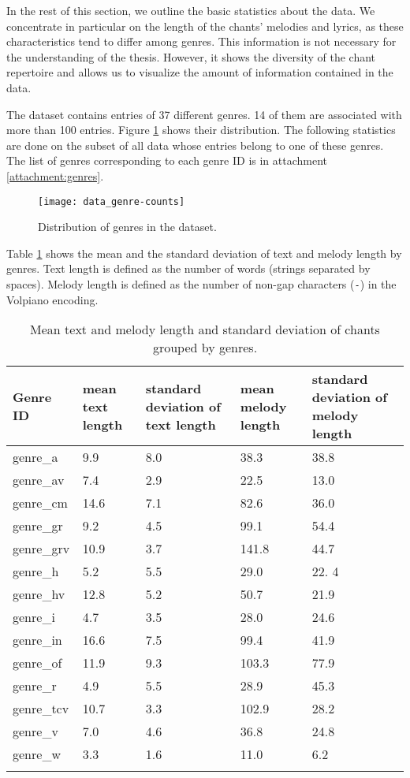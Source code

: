 In the rest of this section, we outline the basic statistics about the data. We concentrate in particular on the length of the chants'
melodies and lyrics, as these characteristics tend to differ among genres. This information is not necessary for the understanding of
the thesis. However, it shows the diversity of the chant repertoire and allows us to visualize the amount of information contained
in the data.

The dataset contains entries of 37 different genres. 14 of them are associated with more than 100 entries. Figure \ref{fig:genre-counts}
shows their distribution. The following statistics are done on the subset of all data whose entries belong to one of these genres.
The list of genres corresponding to each genre ID is in attachment \ref{attachment:genres}.

\begin{figure}[h!]
\centering
\texttt{[image: data\_genre-counts]}
\caption{Distribution of genres in the dataset.}
\label{fig:genre-counts}
\end{figure}

Table \ref{table:genres} shows the mean and the standard deviation of text and melody length by genres. Text length is defined as the number of words
(strings separated by spaces). Melody length is defined as the number of non-gap characters (\verb|-|) in the Volpiano encoding.

\begin{longtable}{| p{} | p{} | p{} | p{} | p{} |}

\hline
Genre ID & mean text length & standard deviation of text length & mean melody length & standard deviation of melody length \\
\hline
genre\_a & 9.9 & 8.0 & 38.3 & 38.8 \\
genre\_av & 7.4 & 2.9 & 22.5 & 13.0 \\
genre\_cm & 14.6 & 7.1 & 82.6 & 36.0\\
genre\_gr & 9.2 & 4.5 & 99.1 & 54.4 \\
genre\_grv & 10.9 & 3.7 & 141.8 & 44.7 \\
genre\_h & 5.2 & 5.5 & 29.0 & 22. 4 \\
genre\_hv & 12.8 & 5.2 & 50.7 & 21.9 \\
genre\_i & 4.7 & 3.5 & 28.0 & 24.6 \\
genre\_in & 16.6 & 7.5 & 99.4 & 41.9 \\
genre\_of & 11.9 & 9.3 & 103.3 & 77.9 \\
genre\_r & 4.9 & 5.5 & 28.9 & 45.3 \\
genre\_tcv & 10.7 & 3.3 & 102.9 & 28.2 \\
genre\_v & 7.0 & 4.6 & 36.8 & 24.8 \\
genre\_w & 3.3 & 1.6 & 11.0 & 6.2 \\
\hline

\caption{Mean text and melody length and standard deviation of chants grouped by genres.}
\label{table:genres}
\end{longtable}

